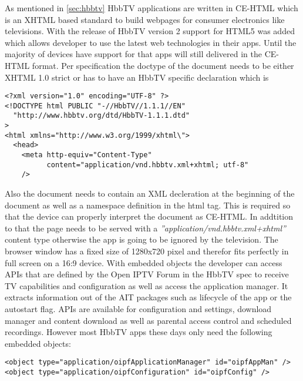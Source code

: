 As mentioned in \ref{sec:hbbtv} HbbTV applications are written in CE-HTML which is an XHTML
based standard to build webpages for consumer electronics like televisions. With the release
of HbbTV version 2 support for HTML5 was added which allows developer to use the latest
web technologies in their apps. Until the majority of devices have support for that apps will
still delivered in the CE-HTML format. Per specification the doctype of the document needs
to be either XHTML 1.0 strict or has to have an HbbTV specific declaration which is

\vspace{1cm}
\begin{lstlisting}[caption=Beginning of an HbbTV document,label=doctype]
<?xml version="1.0" encoding="UTF-8" ?>
<!DOCTYPE html PUBLIC "-//HbbTV//1.1.1//EN"
  "http://www.hbbtv.org/dtd/HbbTV-1.1.1.dtd"
>
<html xmlns="http://www.w3.org/1999/xhtml\">
  <head>
    <meta http-equiv="Content-Type"
          content="application/vnd.hbbtv.xml+xhtml; utf-8"
    />
\end{lstlisting}
\vspace{0.5cm}

Also the document needs to contain an XML decleration at the beginning of the document as well
as a namespace definition in the html tag. This is required so that the device can properly
interpret the document as CE-HTML. In addtition to that the page needs to be served with a
\textit{''application/vnd.hbbtv.xml+xhtml''} content type otherwise the app is going to be
ignored by the television. The browser window has a fixed size of 1280x720 pixel and therefor
fits perfectly in full screen on a 16:9 device. With embedded objects the developer can access
APIs that are defined by the Open IPTV Forum in the HbbTV spec to receive TV capabilities
and configuration as well as access the application manager. It extracts information out of
the AIT packages such as lifecycle of the app or the autostart flag. APIs are available for
configuration and settings, download manager and content download as well as parental access
control and scheduled recordings. However most HbbTV apps these days only need the following
embedded objects:

\vspace{1cm}
\begin{lstlisting}[caption=Embedded Objects used to access HbbTV APIs,label=embeddedObjects]
<object type="application/oipfApplicationManager" id="oipfAppMan" />
<object type="application/oipfConfiguration" id="oipfConfig" />
\end{lstlisting}
\vspace{0.5cm}

